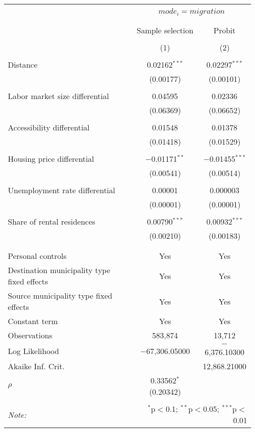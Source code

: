 
\begin{table}[!htbp] \centering 
  \caption{} 
  \label{} 
\begin{tabular}{@{\extracolsep{5pt}}lcc} 
\\[-1.8ex]\hline 
\hline \\[-1.8ex] 
 & \multicolumn{2}{c}{$mode_i = migration$} \\ 
\cline{2-3} 
\\[-1.8ex] &  &  \\ 
 & Sample selection & Probit \\ 
\\[-1.8ex] & (1) & (2)\\ 
\hline \\[-1.8ex] 
 Distance & 0.02162$^{***}$ & 0.02297$^{***}$ \\ 
  & (0.00177) & (0.00101) \\ 
  & & \\ 
 Labor market size differential & 0.04595 & 0.02336 \\ 
  & (0.06369) & (0.06652) \\ 
  & & \\ 
 Accessibility differential & 0.01548 & 0.01378 \\ 
  & (0.01418) & (0.01529) \\ 
  & & \\ 
 Housing price differential & $-$0.01171$^{**}$ & $-$0.01455$^{***}$ \\ 
  & (0.00541) & (0.00514) \\ 
  & & \\ 
 Unemployment rate differential & 0.00001 & 0.000003 \\ 
  & (0.00001) & (0.00001) \\ 
  & & \\ 
 Share of rental residences & 0.00790$^{***}$ & 0.00932$^{***}$ \\ 
  & (0.00210) & (0.00183) \\ 
  & & \\ 
\hline \\[-1.8ex] 
Personal controls & Yes & Yes \\ 
Destination municipality type fixed effects & Yes & Yes \\ 
Source municipality type fixed effects & Yes & Yes \\ 
Constant term & Yes & Yes \\ 
Observations & 583,874 & 13,712 \\ 
Log Likelihood & $-$67,306.05000 & $-$6,376.10300 \\ 
Akaike Inf. Crit. &  & 12,868.21000 \\ 
$\rho$ & 0.33562$^{*}$  (0.20342) &  \\ 
\hline 
\hline \\[-1.8ex] 
\textit{Note:}  & \multicolumn{2}{r}{$^{*}$p$<$0.1; $^{**}$p$<$0.05; $^{***}$p$<$0.01} \\ 
\end{tabular} 
\end{table} 
